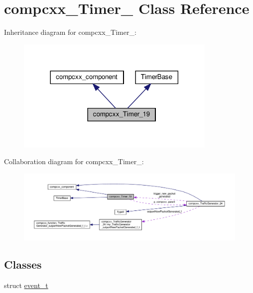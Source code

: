 \hypertarget{classcompcxx__Timer__19}{}\section{compcxx\+\_\+\+Timer\+\_ Class Reference}
\label{classcompcxx__Timer__19}


Inheritance diagram for compcxx\+\_\+\+Timer\+\_\+:\nopagebreak
\begin{figure}[H]
\begin{center}
\leavevmode
\includegraphics[width=272pt]{classcompcxx__Timer__19__inherit__graph}
\end{center}
\end{figure}


Collaboration diagram for compcxx\+\_\+\+Timer\+\_\+:\nopagebreak
\begin{figure}[H]
\begin{center}
\leavevmode
\includegraphics[width=350pt]{classcompcxx__Timer__19__coll__graph}
\end{center}
\end{figure}
\subsection*{Classes}
\begin{DoxyCompactItemize}
\item 
struct \hyperlink{structcompcxx__Timer__19_1_1event__t}{event\+\_\+t}
\end{DoxyCompactItemize}
